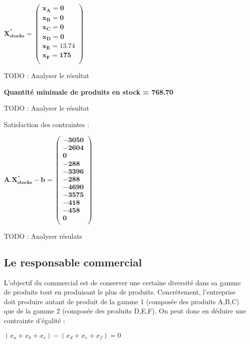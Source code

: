 \documentclass[12pt]{article}
\begin{document}
\begin{center}
$\mathbf{X^{*}_{stocks} = 
   \left (
   \begin{array}{c}
      x_{A} = 0 \\
      x_{B} = 0 \\
      x_{C} = 0 \\
      x_{D} = 0 \\
      x_{E} = 13.74 \\
      x_{F} = 175 \\
   \end{array}
   \right )
 } $ 
\end{center}

TODO : Analyser le résultat
\\
\begin{center}
\textbf{Quantité minimale de produits en stock = 768.70}
\end{center}

TODO : Analyser le résultat

Satisfaction des contraintes : 
\begin{center}
$\mathbf{A.X^{*}_{stocks} - b = 
   \left (
   \begin{array}{c}
      -3050 \\
      -2604 \\
      0 \\
      -288 \\
      -3396\\
      -288 \\
      -4690 \\
      -3575 \\
      -418 \\
      -458\\
      0\\
   \end{array}
   \right )
 } $ 
\end{center}

TODO : Analyser résulats

\subsection{Le responsable commercial}
L'objectif du commercial est de conserver une certaine diversité dans sa gamme de produits tout en produisant le plus de produits. Concrètement, l’entreprise doit produire autant de produit de la gamme 1 (composée des produits A,B,C) que de la gamme 2 (composée des produits D,E,F).
On peut donc en déduire une contrainte d’égalité :\begin{center} $(x_{a} + x_{b} + x_{c}) - (x_{d} + x_{e} + x_{f}) = 0$ \end{center}
\end{document}
